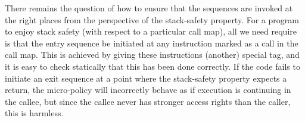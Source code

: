 \documentclass[acmsmall,review,anonymous]{acmart}\settopmatter{printfolios=true,printccs=false,printacmref=false}
\begin{document}
{There remains the question of how to ensure that the sequences are
invoked at the right places from the perspective of the stack-safety
property. For a program to enjoy stack safety
(with respect to a particular call map), all we need require is that
the entry sequence be initiated at any instruction marked as a call
in the call map. This is achieved by giving these instructions (another) special tag,
and it is easy to check statically that this has been done correctly.
If the code fails to initiate an exit
sequence at a point where the stack-safety property expects a return,
the micro-policy will incorrectly behave as if execution
is continuing in the callee, but since the callee never has stronger access
rights than the caller, this is harmless.




}
\end{document}

